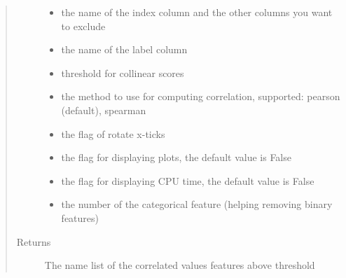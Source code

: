 \documentclass[letterpaper,11pt,english]{sphinxmanual}
\begin{document}
\begin{fulllineitems}
\begin{fulllineitems}
\begin{quote}
\begin{description}
\begin{itemize}
\item {} 
 \textendash{} the name of the index column and the other columns you want to exclude

\item {} 
 \textendash{} the name of the label column

\item {} 
 \textendash{} threshold for collinear scores

\item {} 
 \textendash{} the method to use for computing correlation, supported: pearson (default), spearman

\item {} 
 \textendash{} the flag of rotate x-ticks

\item {} 
 \textendash{} the flag for displaying plots, the default value is False

\item {} 
 \textendash{} the flag for displaying CPU time, the default value is False

\item {} 
 \textendash{} the number of the categorical feature (helping removing binary features)

\end{itemize}

\item[{Returns}] \leavevmode
The name list of the correlated values features above threshold

\end{description}\end{quote}

\end{fulllineitems}



\end{fulllineitems}
\end{document}
